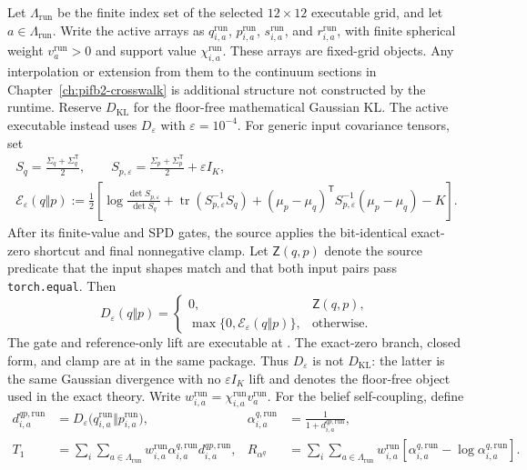 Let \(\Lambda_{\mathrm{run}}\) be the finite index set of the selected $12\times12$ executable grid, and let \(a\in\Lambda_{\mathrm{run}}\). Write the active arrays as \(q_{i,a}^{\mathrm{run}}\), \(p_{i,a}^{\mathrm{run}}\), \(s_{i,a}^{\mathrm{run}}\), and \(r_{i,a}^{\mathrm{run}}\), with finite spherical weight \(v_a^{\mathrm{run}}>0\) and support value \(\chi_{i,a}^{\mathrm{run}}\). These arrays are fixed-grid objects. Any interpolation or extension from them to the continuum sections in Chapter~\ref{ch:pifb2-crosswalk} is additional structure not constructed by the runtime. Reserve $D_{\mathrm{KL}}$ for the floor-free mathematical Gaussian KL. The active executable instead uses $D_\varepsilon$ with $\varepsilon=10^{-4}$. For generic input covariance tensors, set
\begin{gather}
 S_q=\frac{\Sigma_q+\Sigma_q^{\mathsf T}}{2},
 \qquad
 S_{p,\varepsilon}=\frac{\Sigma_p+\Sigma_p^{\mathsf T}}{2}+\varepsilon I_K,
\\
 \mathcal E_\varepsilon(q\Vert p)
 :=\frac12\left[
 \log\frac{\det S_{p,\varepsilon}}{\det S_q}
 +\operatorname{tr}(S_{p,\varepsilon}^{-1}S_q)
 +(\mu_p-\mu_q)^{\mathsf T}S_{p,\varepsilon}^{-1}(\mu_p-\mu_q)-K
 \right].
\end{gather}
After its finite-value and SPD gates, the source applies the bit-identical exact-zero shortcut and final nonnegative clamp. Let $\mathsf Z(q,p)$ denote the source predicate that the input shapes match and that both input pairs pass \texttt{torch.equal}. Then
\begin{equation}
 D_\varepsilon(q\Vert p)=
 \begin{cases}
 0,
 & \mathsf Z(q,p),\\
 \max\{0,\mathcal E_\varepsilon(q\Vert p)\},
 & \text{otherwise}.
 \end{cases}
 \label{eq:executable-divergence}
\end{equation}
The gate and reference-only lift are executable at . The exact-zero branch, closed form, and clamp are at  in the same package. Thus $D_\varepsilon$ is not $D_{\mathrm{KL}}$: the latter is the same Gaussian divergence with no $\varepsilon I_K$ lift and denotes the floor-free object used in the exact theory. Write \(w_{i,a}^{\mathrm{run}}=\chi_{i,a}^{\mathrm{run}}v_a^{\mathrm{run}}\). For the belief self-coupling, define
\begin{align}
 d_{i,a}^{qp,\mathrm{run}}
 &=D_\varepsilon\bigl(q_{i,a}^{\mathrm{run}}\Vert
 p_{i,a}^{\mathrm{run}}\bigr),
 &\alpha_{i,a}^{q,\mathrm{run}}
 &=\frac{1}{1+d_{i,a}^{qp,\mathrm{run}}},\\
 T_1
 &=\sum_i\sum_{a\in\Lambda_{\mathrm{run}}}
 w_{i,a}^{\mathrm{run}}\alpha_{i,a}^{q,\mathrm{run}}
 d_{i,a}^{qp,\mathrm{run}},
 &R_{\alpha^q}
 &=\sum_i\sum_{a\in\Lambda_{\mathrm{run}}}
 w_{i,a}^{\mathrm{run}}
 \left[\alpha_{i,a}^{q,\mathrm{run}}
 -\log\alpha_{i,a}^{q,\mathrm{run}}\right].
\end{align}
